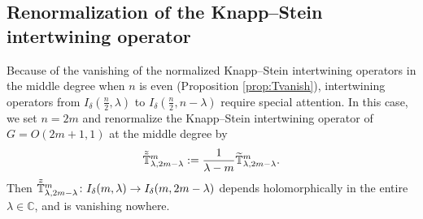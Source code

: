 \subsection{Renormalization of the Knapp--Stein intertwining operator}
\label{subsec:renormT}
Because of the vanishing of the normalized Knapp--Stein intertwining operators
 in the middle degree 
 when $n$ is even (Proposition \ref{prop:Tvanish}), 
 intertwining operators from $I_{\delta}(\frac n 2, \lambda)$ to $I_{\delta}(\frac n 2, n-\lambda)$ require special attention.  
In this case, 
we set $n=2m$ and renormalize the Knapp--Stein intertwining operator
 of $G=O(2m+1,1)$ at the middle degree by
\begin{equation}
\label{eqn:Ttilde}
   \tilde{\tilde{{\mathbb{T}}}}_{{\lambda},{2m-\lambda}}^{{m}}
   :=
   \frac{1}{\lambda-m} \widetilde{{\mathbb{T}}}_{{\lambda},{2m-\lambda}}^{{m}}.  
\end{equation}
Then $\tilde{\tilde{{\mathbb{T}}}}_{{\lambda},{2m-\lambda}}^{{m}} \colon I_{\delta}(m, \lambda) \to I_{\delta}(m, 2m-\lambda)$ depends
holomorphically in the entire $\lambda \in {\mathbb{C}}$,
 and is vanishing nowhere.  



